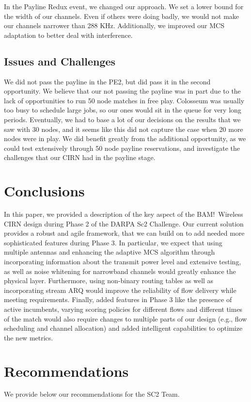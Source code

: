 \documentclass[11pt]{article}
\begin{document}
In the Payline Redux event, we changed our approach. We set a lower bound for the width of our channels. Even if others were doing badly, we would not make our channels narrower than 288 KHz. Additionally, we improved our MCS adaptation to better deal with interference.

\subsection{Issues and Challenges}

We did not pass the payline in the PE2, but did pass it in the second opportunity. We believe that our not passing the payline was in part due to the lack of opportunities to run 50 node matches in free play. Colosseum was usually too busy to schedule large jobs, so our ones would sit in the queue for very long periods. Eventually, we had to base a lot of our decisions on the results that we saw with 30 nodes, and it seems like this did not capture the case when 20 more nodes were in play. We did benefit greatly from the additional opportunity, as we could test extensively through 50 node payline reservations, and investigate the challenges that our CIRN had in the payline stage. 

\section{Conclusions}
In this paper, we provided a description of the key aspect of the BAM!\ Wireless CIRN design during Phase 2 of the DARPA Sc2 Challenge. Our current solution provides a robust and agile framework, that we can build on to add needed more sophisticated features during Phase 3. In particular, we expect that using multiple antennas and enhancing the adaptive MCS algorithm through incorporating information about the transmit power level and extensive testing, as well as noise whitening for narrowband channels would greatly enhance the physical layer. Furthermore, using non-binary routing tables as well as incorporating stream ARQ would improve the reliability of flow delivery while meeting requirements. Finally, added features in Phase 3 like the presence of active incumbents, varying scoring policies for different flows and different times of the match would also require changes to multiple parts of our design (e.g., flow scheduling and channel allocation) and added intelligent capabilities to optimize the new metrics.
\section{Recommendations}
We provide below our recommendations for the SC2 Team.
\end{document}
